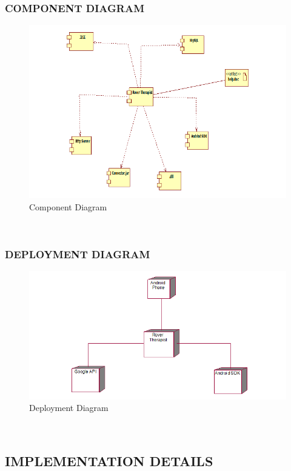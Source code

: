 \documentclass[12pt,a4paper]{article}
\begin{document}
\subsubsection{COMPONENT DIAGRAM}
\begin{figure}[!htb]
\centering
\includegraphics[width=15 cm]{component}
\caption{Component Diagram}
\end{figure}
\\
\newpage
\subsubsection{DEPLOYMENT DIAGRAM}
\begin{figure}[!htb]
\centering
\includegraphics[width=15 cm]{deployment}
\caption{Deployment Diagram}
\end{figure}
\\

\newpage
\pagestyle{plain}
\begin{center}
\section{IMPLEMENTATION DETAILS}
\end{center} 
\\
\end{document}
